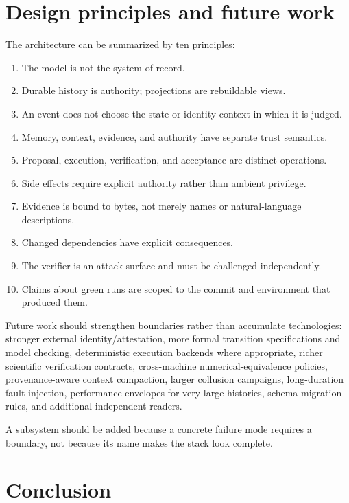 \section{Design principles and future work}

The architecture can be summarized by ten principles:

\begin{enumerate}
  \item The model is not the system of record.
  \item Durable history is authority; projections are rebuildable views.
  \item An event does not choose the state or identity context in which it is judged.
  \item Memory, context, evidence, and authority have separate trust semantics.
  \item Proposal, execution, verification, and acceptance are distinct operations.
  \item Side effects require explicit authority rather than ambient privilege.
  \item Evidence is bound to bytes, not merely names or natural-language descriptions.
  \item Changed dependencies have explicit consequences.
  \item The verifier is an attack surface and must be challenged independently.
  \item Claims about green runs are scoped to the commit and environment that produced them.
\end{enumerate}

Future work should strengthen boundaries rather than accumulate technologies: stronger external identity/attestation, more formal transition specifications and model checking, deterministic execution backends where appropriate, richer scientific verification contracts, cross-machine numerical-equivalence policies, provenance-aware context compaction, larger collusion campaigns, long-duration fault injection, performance envelopes for very large histories, schema migration rules, and additional independent readers.

A subsystem should be added because a concrete failure mode requires a boundary, not because its name makes the stack look complete.

\section{Conclusion}

